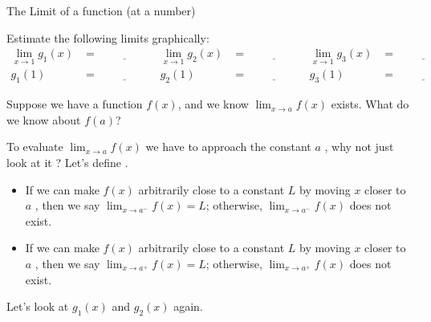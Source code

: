 \documentclass[../main.tex]{subfiles}
\begin{document}
\begin{lesson}{The Limit of a function (at a number)}
\begin{example}
    Estimate the following limits graphically:
    \begin{align*}
      \lim_{x \to 1} g_{1}(x)  
      &= \underline{\hspace{2cm}}  
      & \lim_{x \to 1} g_{2}(x) 
      &= \underline{\hspace{2cm}}
      & \lim_{x \to 1} g_{3}(x) 
      &= \underline{\hspace{2cm}} \\[2ex]
      g_{1}(1)  
      &= \underline{\hspace{2cm}}  
      & g_{2}(1) 
      &= \underline{\hspace{2cm}}
      & g_{3}(1) 
      &= \underline{\hspace{2cm}}
    \end{align*}
  \end{example}

  \faComments{} Suppose we have a function \(f(x)\), and we know \(\lim_{x \to a} f(x)\) exists. What do we know about \(f(a)\)?
  \clearpage

  To evaluate \(\lim_{x \to a} f(x)\) we have to approach the constant \(a\) , why not just look at it ?  Let's define .
  \begin{itemize}
    \item If we can make \(f(x)\) arbitrarily close to a constant \(L\) by moving \(x\) closer to \(a\) , then we say \(\lim_{x \to a^{-}} f(x) = L\); otherwise, \(\lim_{x \to a^{-}} f(x)\) does not exist.
  
    \item If we can make \(f(x)\) arbitrarily close to a constant \(L\) by moving \(x\) closer to \(a\) , then we say \(\lim_{x \to a^{+}} f(x) = L\); otherwise, \(\lim_{x \to a^{+}} f(x)\) does not exist.
  \end{itemize}
  
  \begin{example}
    Let's look at \(g_{1}(x)\) and \(g_{2}(x)\) again.

    \begin{center}
      \hspace{1in}
\end{center}
\end{example}
\end{lesson}
\end{document}
